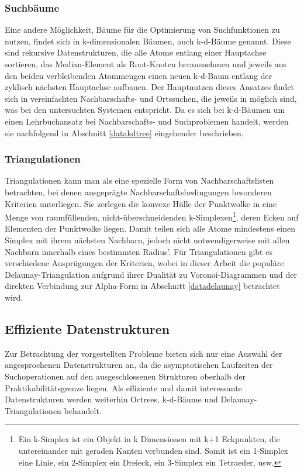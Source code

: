 \subsubsection{Suchbäume}

Eine andere Möglichkeit, Bäume für die Optimierung von Suchfunktionen zu nutzen, findet sich in k-dimensionalen Bäumen, auch k-d-Bäume genannt.
Diese sind rekursive Datenstrukturen, die alle Atome entlang einer Hauptachse sortieren, das Median-Element als Root-Knoten herausnehmen und jeweils aus den beiden verbleibenden Atommengen einen neuen k-d-Baum entlang der zyklisch nächsten Hauptachse aufbauen.
Der Hauptnutzen dieses Ansatzes findet sich in vereinfachten Nachbarschafts- und Ortssuchen, die jeweils in  möglich sind, was bei den untersuchten Systemen  entspricht.
Da es sich bei k-d-Bäumen um einen Lehrbuchansatz bei Nachbarschafts- und Suchproblemen handelt, werden sie nachfolgend in Abschnitt \ref{datakdtree} eingehender beschrieben.

\subsubsection{Triangulationen}

Triangulationen kann man als eine spezielle Form von Nachbarschaftslisten betrachten, bei denen ausgeprägte Nachbarschaftsbedingungen besonderen Kriterien unterliegen.
Sie zerlegen die konvexe Hülle der Punktwolke in eine Menge von raumfüllenden, nicht-überschneidenden k-Simplexen\footnote{Ein k-Simplex ist ein Objekt in k Dimensionen mit k+1 Eckpunkten, die untereinander mit geraden Kanten verbunden sind. Somit ist ein 1-Simplex eine Linie, ein 2-Simplex ein Dreieck, ein 3-Simplex ein Tetraeder, usw.}, deren Ecken auf Elementen der Punktwolke liegen.
Damit teilen sich alle Atome mindestens einen Simplex mit ihrem nächsten Nachbarn, jedoch nicht notwendigerweise mit allen Nachbarn innerhalb eines bestimmten Radius'.
Für Triangulationen gibt es verschiedene Ausprügungen der Kriterien, wobei in dieser Arbeit die populäre Delaunay-Triangulation aufgrund ihrer Dualität zu Voronoi-Diagrammen und der direkten Verbindung zur Alpha-Form in Abschnitt \ref{datadelaunay} betrachtet wird.

\subsection{Effiziente Datenstrukturen}

Zur Betrachtung der vorgestellten Probleme bieten sich nur eine Auswahl der angesprochenen Datenstrukturen an, da die asymptotischen Laufzeiten der Suchoperationen auf den ausgeschlossenen Strukturen oberhalb der Praktikabilitätsgrenze liegen.
Als effiziente und damit interessante Datenstrukturen werden weiterhin Octrees, k-d-Bäume und Delaunay-Triangulationen behandelt.

